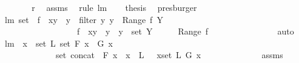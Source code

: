 \begin{isabellebody}
\ \ \isamarkupfalse%
\ \isamarkupfalse%
\ {\isachardoublequoteopen}{\isachardot}{\isachardot}{\isachardot}\ {\isacharequal}\ {\isacharquery}r{\isachardoublequoteclose}\ \isamarkupfalse%
\ assms\ \isamarkupfalse%
\ {\isacharparenleft}rule\ lm{}{}{\isacharparenright}\ \isamarkupfalse%
\ \isamarkupfalse%
\ {\isacharquery}thesis\ \isamarkupfalse%
\ presburger\ \isanewline
{}\isamarkupfalse%
%
\endisatagproof
{\isafoldproof}%
%
\isadelimproof
\isanewline
%
\endisadelimproof
\isanewline
{}\isamarkupfalse%
\ lm{}{}{\isacharcolon}\ {\isachardoublequoteopen}set\ {\isacharbrackleft}\ f\ {\isasymunion}\ {\isacharbraceleft}{\isacharparenleft}x{\isacharcomma}y{\isacharparenright}{\isacharbraceright}\ {\isachardot}\ y\ {\isasymleftarrow}\ {\isacharparenleft}filter\ {\isacharparenleft}{\isacharpercent}y{\isachardot}\ y\ {\isasymnotin}\ {\isacharparenleft}Range\ f{\isacharparenright}{\isacharparenright}\ Y{\isacharparenright}\ {\isacharbrackright}\ {\isacharequal}\ \isanewline
\ \ \ \ \ \ \ \ \ \ \ \ \ \ \ \ \ \ {\isacharbraceleft}f\ {\isasymunion}\ {\isacharbraceleft}{\isacharparenleft}x{\isacharcomma}y{\isacharparenright}{\isacharbraceright}\ {\isacharbar}\ y\ {\isachardot}\ y\ {\isasymin}\ {\isacharparenleft}set\ Y{\isacharparenright}\ {\isacharminus}\ \ \ \ \ {\isacharparenleft}Range\ f{\isacharparenright}{\isacharbraceright}{\isachardoublequoteclose}\ \isanewline
%
\isadelimproof
\ \ \ \ \ \ \ \ \ \ \ \ \ %
\endisadelimproof
%
\isatagproof
{}\isamarkupfalse%
\ auto%
\endisatagproof
{\isafoldproof}%
%
\isadelimproof
\isanewline
%
\endisadelimproof
\isanewline
\isanewline
{}\isamarkupfalse%
\ lm{}{}{\isacharcolon}\ \ {\isachardoublequoteopen}{\isasymforall}x\ {\isasymin}\ set\ L{\isachardot}\ set\ {\isacharparenleft}F\ x{\isacharparenright}\ {\isacharequal}\ G\ x{\isachardoublequoteclose}\ \isanewline
\ \ \ \ \ \ \ \ \ \ \ \ \ {\isachardoublequoteopen}set\ {\isacharparenleft}concat\ {\isacharbrackleft}\ F\ x\ {\isachardot}\ x\ {\isacharless}{\isacharminus}\ L{\isacharbrackright}{\isacharparenright}\ {\isacharequal}\ {\isacharparenleft}{\isasymUnion}\ x{\isasymin}set\ L{\isachardot}\ G\ x{\isacharparenright}{\isachardoublequoteclose}\isanewline
%
\isadelimproof
\ \ \ \ \ \ \ \ \ \ \ \ %
\endisadelimproof
%
\isatagproof
{}\isamarkupfalse%
\ assms\ \isamarkupfalse%

\end{isabellebody}
